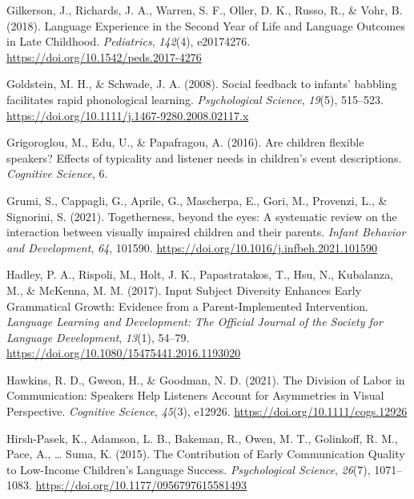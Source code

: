 \documentclass[
  man,floatsintext]{apa6}
\newlength{\cslhangindent}
\newlength{\cslentryspacingunit} %
\newenvironment{CSLReferences}[2] %
 {%
  \setlength{\parindent}{0pt}
  \ifodd #1
  \let\oldpar\par
  \def\par{\hangindent=\cslhangindent\oldpar}
  \fi
  \setlength{\parskip}{#2\cslentryspacingunit}
 }%
 {}
\begin{document}
\begin{CSLReferences}{1}{0}
\leavevmode{}%
Gilkerson, J., Richards, J. A., Warren, S. F., Oller, D. K., Russo, R., \& Vohr, B. (2018). Language {Experience} in the {Second Year} of {Life} and {Language Outcomes} in {Late Childhood}. \emph{Pediatrics}, \emph{142}(4), e20174276. \url{https://doi.org/10.1542/peds.2017-4276}

\leavevmode{}%
Goldstein, M. H., \& Schwade, J. A. (2008). Social feedback to infants' babbling facilitates rapid phonological learning. \emph{Psychological Science}, \emph{19}(5), 515--523. \url{https://doi.org/10.1111/j.1467-9280.2008.02117.x}

\leavevmode{}%
Grigoroglou, M., Edu, U., \& Papafragou, A. (2016). Are children flexible speakers? {Effects} of typicality and listener needs in children's event descriptions. \emph{Cognitive Science}, 6.

\leavevmode{}%
Grumi, S., Cappagli, G., Aprile, G., Mascherpa, E., Gori, M., Provenzi, L., \& Signorini, S. (2021). Togetherness, beyond the eyes: {A} systematic review on the interaction between visually impaired children and their parents. \emph{Infant Behavior and Development}, \emph{64}, 101590. \url{https://doi.org/10.1016/j.infbeh.2021.101590}

\leavevmode{}%
Hadley, P. A., Rispoli, M., Holt, J. K., Papastratakos, T., Hsu, N., Kubalanza, M., \& McKenna, M. M. (2017). Input {Subject Diversity Enhances Early Grammatical Growth}: {Evidence} from a {Parent-Implemented Intervention}. \emph{Language Learning and Development: The Official Journal of the Society for Language Development}, \emph{13}(1), 54--79. \url{https://doi.org/10.1080/15475441.2016.1193020}

\leavevmode{}%
Hawkins, R. D., Gweon, H., \& Goodman, N. D. (2021). The {Division} of {Labor} in {Communication}: {Speakers Help Listeners Account} for {Asymmetries} in {Visual Perspective}. \emph{Cognitive Science}, \emph{45}(3), e12926. \url{https://doi.org/10.1111/cogs.12926}

\leavevmode{}%
Hirsh-Pasek, K., Adamson, L. B., Bakeman, R., Owen, M. T., Golinkoff, R. M., Pace, A., \ldots{} Suma, K. (2015). The {Contribution} of {Early Communication Quality} to {Low-Income Children}'s {Language Success}. \emph{Psychological Science}, \emph{26}(7), 1071--1083. \url{https://doi.org/10.1177/0956797615581493}


\end{CSLReferences}
\end{document}
